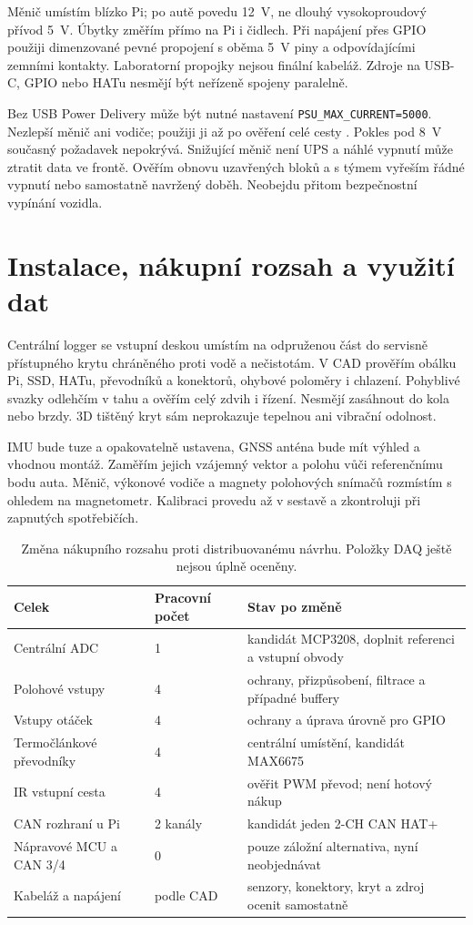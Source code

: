 Měnič umístím blízko Pi; po autě povedu \SI{12}{V}, ne dlouhý
vysokoproudový přívod \SI{5}{V}. Úbytky změřím přímo na Pi i čidlech.
Při napájení přes GPIO použiji dimenzované pevné propojení s oběma
\SI{5}{V} piny a odpovídajícími zemními kontakty. Laboratorní
propojky nejsou finální kabeláž. Zdroje na USB-C, GPIO nebo HATu
nesmějí být neřízeně spojeny paralelně.

Bez USB Power Delivery může být nutné nastavení
\texttt{PSU\_MAX\_CURRENT=5000}. Nezlepší měnič ani vodiče;
použiji ji až po ověření celé cesty \cite{rpi-power-integrace}.
Pokles pod \SI{8}{V} současný požadavek nepokrývá. Snižující měnič
není UPS a náhlé vypnutí může ztratit data ve frontě. Ověřím obnovu
uzavřených bloků a s týmem vyřeším řádné vypnutí nebo samostatně
navržený doběh. Neobejdu přitom bezpečnostní vypínání vozidla.

\section{Instalace, nákupní rozsah a využití dat}

Centrální logger se vstupní deskou umístím na odpruženou část do
servisně přístupného krytu chráněného proti vodě a nečistotám.
V CAD prověřím obálku Pi, SSD, HATu, převodníků a konektorů,
ohybové poloměry i chlazení. Pohyblivé svazky odlehčím v tahu
a ověřím celý zdvih i řízení. Nesmějí zasáhnout do kola nebo brzdy.
3D tištěný kryt sám neprokazuje tepelnou ani vibrační odolnost.

IMU bude tuze a opakovatelně ustavena, GNSS anténa bude mít výhled
a vhodnou montáž. Zaměřím jejich vzájemný vektor a polohu vůči
referenčnímu bodu auta. Měnič, výkonové vodiče a magnety polohových
snímačů rozmístím s ohledem na magnetometr. Kalibraci provedu až
v sestavě a zkontroluji při zapnutých spotřebičích.

\begin{table}[htbp]
\centering\small
\caption{Změna nákupního rozsahu proti distribuovanému návrhu. Položky DAQ ještě nejsou úplně oceněny.}
\label{tab:adc-nakup}
\begin{tabularx}{\textwidth}{@{}L{38mm}L{26mm}Y@{}}
\toprule
Celek & Pracovní počet & Stav po změně \\
\midrule
Centrální ADC & 1 & kandidát MCP3208, doplnit referenci a vstupní obvody \\
Polohové vstupy & 4 & ochrany, přizpůsobení, filtrace a případné buffery \\
Vstupy otáček & 4 & ochrany a úprava úrovně pro GPIO \\
Termočlánkové převodníky & 4 & centrální umístění, kandidát MAX6675 \\
IR vstupní cesta & 4 & ověřit PWM převod; není hotový nákup \\
CAN rozhraní u Pi & 2 kanály & kandidát jeden 2-CH CAN HAT+ \\
Nápravové MCU a CAN 3/4 & 0 & pouze záložní alternativa, nyní neobjednávat \\
Kabeláž a napájení & podle CAD & senzory, konektory, kryt a zdroj ocenit samostatně \\
\bottomrule
\end{tabularx}
\end{table}

